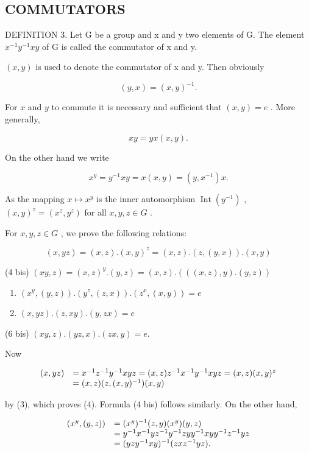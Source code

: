 \subsection{COMMUTATORS}

DEFINITION 3. Let G be a group and x and y two elements of G. The element \(x^{-1}y^{-1}xy\) of G is called the commutator of x and y.

\((x,y)\) is used to denote the commutator of x and y. Then obviously

\[
(y, x) = (x, y) ^ {- 1}.
\]

For \(x\) and \(y\) to commute it is necessary and sufficient that \((x, y) = e\) . More generally,

\[
x y = y x (x, y).
\]

On the other hand we write

\[
x ^ {y} = y ^ {- 1} x y = x (x, y) = (y, x ^ {- 1}) x.\tag{3}
\]

As the mapping \(x \mapsto x^y\) is the inner automorphism \(\operatorname{Int}(y^{-1})\) , \((x, y)^z = (x^z, y^z)\) for all \(x, y, z \in G\) .

For \(x, y, z \in G\) , we prove the following relations:

\[
(x, y z) = (x, z). (x, y) ^ {z} = (x, z). (z, (y, x)). (x, y)\tag{4}
\]

(4 bis) \((xy,z) = (x,z)^y.(y,z) = (x,z).(((x,z),y).(y,z))\)

\begin{enumerate}
\def\labelenumi{(\arabic{enumi})}
\setcounter{enumi}{4}
\item
  \((x^{y}, (y, z)).(y^{z}, (z, x)).(z^{x}, (x, y)) = e\)
\item
  \((x, yz).(z, xy).(y, zx) = e\)
\end{enumerate}

(6 bis) \((xy, z). (yz, x). (zx, y) = e.\)

Now

\[
\begin{array}{r l} (x, y z) & = x ^ {- 1} z ^ {- 1} y ^ {- 1} x y z = (x, z) z ^ {- 1} x ^ {- 1} y ^ {- 1} x y z = (x, z) (x, y) ^ {z} \\ & = (x, z) (z, (x, y) ^ {- 1}) (x, y) \end{array}
\]

by (3), which proves (4). Formula (4 bis) follows similarly. On the other hand,

\[
\begin{array}{r l} (x ^ {y}, (y, z)) & = (x ^ {y}) ^ {- 1} (z, y) (x ^ {y}) (y, z) \\ & = y ^ {- 1} x ^ {- 1} y z ^ {- 1} y ^ {- 1} z y y ^ {- 1} x y y ^ {- 1} z ^ {- 1} y z \\ & = (y z y ^ {- 1} x y) ^ {- 1} (z x z ^ {- 1} y z). \end{array}
\]

